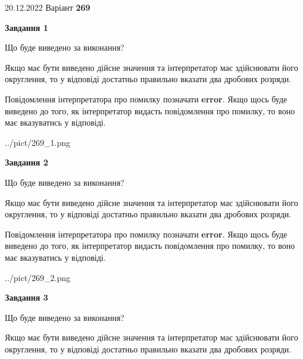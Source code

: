 \documentclass[12pt, ukrainian]{article}
\begin{document}
{20.12.2022 Варіант \No \textbf { 269 }\par}
{
\begin {Large}

{\begin {center}\textbf{Завдання 1}\end {center}}\par
Що буде виведено за виконання? \par

Якщо має бути виведено дійсне значення та інтерпретатор має здійснювати його округлення, 
то у відповіді достатньо правильно вказати два дробових розряди.

Повідомлення інтерпретатора про помилку позначати \textbf{error}.
Якщо щось буде виведено до того, як інтерпретатор видасть повідомлення про помилку, 
то воно має вказуватись у відповіді. \par

\begin{center}
	{../pict/269_1.png}
\end{center}
\newpage

{\begin {center}\textbf{Завдання 2}\end {center}}\par
Що буде виведено за виконання? \par

Якщо має бути виведено дійсне значення та інтерпретатор має здійснювати його округлення, 
то у відповіді достатньо правильно вказати два дробових розряди.

Повідомлення інтерпретатора про помилку позначати \textbf{error}.
Якщо щось буде виведено до того, як інтерпретатор видасть повідомлення про помилку, 
то воно має вказуватись у відповіді. \par

\begin{center}
	{../pict/269_2.png}
\end{center}
\newpage

{\begin {center}\textbf{Завдання 3}\end {center}}\par
Що буде виведено за виконання? \par

Якщо має бути виведено дійсне значення та інтерпретатор має здійснювати його округлення, 
то у відповіді достатньо правильно вказати два дробових розряди.


\end{Large}}
\end{document}
